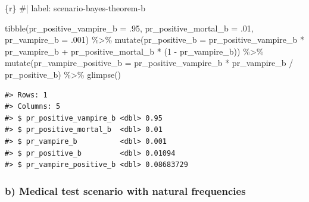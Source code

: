 \documentclass[
  letterpaper,
  DIV=11,
  numbers=noendperiod]{scrreprt}
\newenvironment{Shaded}{\begin{snugshade}}{\end{snugshade}}
\newcommand{\AttributeTok}[1]{\textcolor[rgb]{0.40,0.45,0.13}{#1}}
\newcommand{\CommentTok}[1]{\textcolor[rgb]{0.37,0.37,0.37}{#1}}
\newcommand{\DecValTok}[1]{\textcolor[rgb]{0.68,0.00,0.00}{#1}}
\newcommand{\FunctionTok}[1]{\textcolor[rgb]{0.28,0.35,0.67}{#1}}
\newcommand{\InformationTok}[1]{\textcolor[rgb]{0.37,0.37,0.37}{#1}}
\newcommand{\NormalTok}[1]{\textcolor[rgb]{0.00,0.23,0.31}{#1}}
\newcommand{\SpecialCharTok}[1]{\textcolor[rgb]{0.37,0.37,0.37}{#1}}
\begin{document}
\begin{Shaded}
\begin{Highlighting}[]
\InformationTok{\textasciigrave{}\textasciigrave{}\textasciigrave{}\{r\}}
\CommentTok{\#| label: scenario{-}bayes{-}theorem{-}b}

\FunctionTok{tibble}\NormalTok{(}\AttributeTok{pr\_positive\_vampire\_b =}\NormalTok{ .}\DecValTok{95}\NormalTok{,}
       \AttributeTok{pr\_positive\_mortal\_b  =}\NormalTok{ .}\DecValTok{01}\NormalTok{,}
       \AttributeTok{pr\_vampire\_b          =}\NormalTok{ .}\DecValTok{001}\NormalTok{) }\SpecialCharTok{\%\textgreater{}\%} 
  \FunctionTok{mutate}\NormalTok{(}\AttributeTok{pr\_positive\_b =}\NormalTok{ pr\_positive\_vampire\_b }\SpecialCharTok{*}\NormalTok{ pr\_vampire\_b }\SpecialCharTok{+}\NormalTok{ pr\_positive\_mortal\_b }\SpecialCharTok{*}\NormalTok{ (}\DecValTok{1} \SpecialCharTok{{-}}\NormalTok{ pr\_vampire\_b)) }\SpecialCharTok{\%\textgreater{}\%} 
  \FunctionTok{mutate}\NormalTok{(}\AttributeTok{pr\_vampire\_positive\_b =}\NormalTok{ pr\_positive\_vampire\_b }\SpecialCharTok{*}\NormalTok{ pr\_vampire\_b }\SpecialCharTok{/}\NormalTok{ pr\_positive\_b) }\SpecialCharTok{\%\textgreater{}\%} 
  \FunctionTok{glimpse}\NormalTok{()}
\InformationTok{\textasciigrave{}\textasciigrave{}\textasciigrave{}}
\end{Highlighting}
\end{Shaded}

\begin{verbatim}
#> Rows: 1
#> Columns: 5
#> $ pr_positive_vampire_b <dbl> 0.95
#> $ pr_positive_mortal_b  <dbl> 0.01
#> $ pr_vampire_b          <dbl> 0.001
#> $ pr_positive_b         <dbl> 0.01094
#> $ pr_vampire_positive_b <dbl> 0.08683729
\end{verbatim}

\hypertarget{b-medical-test-scenario-with-natural-frequencies-1}{%
\subsubsection*{b) Medical test scenario with natural
frequencies}\label{b-medical-test-scenario-with-natural-frequencies-1}}
\end{document}
